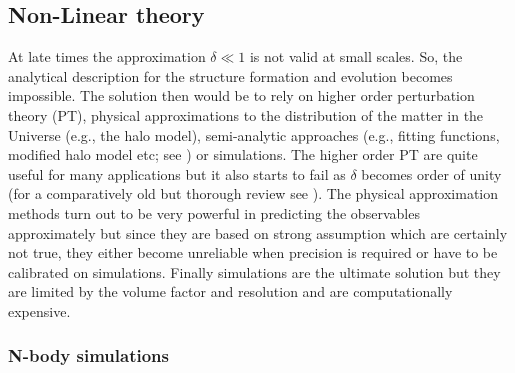 \subsection{Non-Linear theory}

At late times the approximation $\delta \ll 1$ is not valid at small scales. So, the analytical
description for the structure formation and evolution becomes impossible. The solution then would 
be to rely on higher order perturbation theory (PT), physical approximations to the
distribution of the matter in the Universe (e.g., the halo model), 
semi-analytic approaches (e.g., fitting functions, modified halo model etc;
see \cite{Takahashi:2012em,Smith:2002dz}) or simulations. 
The higher order PT are quite useful for many applications but it also starts to 
fail as $\delta$ becomes order of unity (for a comparatively old
but thorough review see \cite{1994FCPh...15..209D}). 
The physical approximation methods turn 
out to be very powerful in predicting the observables approximately 
but since they are based on strong assumption which are 
certainly not true, they either become unreliable when precision is required or have
to be calibrated on simulations. Finally simulations are the ultimate solution but they
are limited by the volume factor and resolution and are computationally expensive. 


\subsubsection{N-body simulations}

